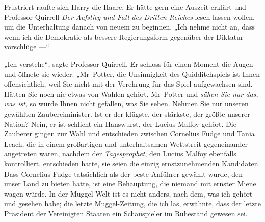 Frustriert raufte sich Harry die Haare. Er hätte gern eine Auszeit erklärt und Professor Quirrell \emph{Der Aufstieg und Fall des Dritten Reiches} lesen lassen wollen, um die Unterhaltung danach von neuem zu beginnen.
„Ich nehme nicht an, dass wenn ich die Demokratie als bessere Regierungsform gegenüber der Diktatur vorschlüge —“

„Ich verstehe“, sagte Professor Quirrell. Er schloss für einen Moment die Augen und öffnete sie wieder.
„Mr~Potter, die Unsinnigkeit des Quidditchspiels ist Ihnen offensichtlich, weil Sie nicht mit der Verehrung für das Spiel aufgewachsen sind. Hätten Sie noch nie etwas von Wahlen gehört, Mr~Potter und \emph{sähen Sie nur das, was ist}, so würde Ihnen nicht gefallen, was Sie sehen. Nehmen Sie nur unseren gewählten Zaubereiminister. Ist er der klügste, der stärkste, der größte unserer Nation? Nein, er ist schlicht ein Hanswurst, der Lucius Malfoy gehört. Die Zauberer gingen zur Wahl und entschieden zwischen Cornelius Fudge und Tania Leach, die in einem großartigen und unterhaltsamen Wettstreit gegeneinander angetreten waren, nachdem der \emph{Tagesprophet}, den Lucius Malfoy ebenfalls kontrolliert, entschieden hatte, sie seien die einzig ernstzunehmenden Kandidaten. Dass Cornelius Fudge tatsächlich als der beste Anführer gewählt wurde, den unser Land zu bieten hatte, ist eine Behauptung, die niemand mit ernster Miene wagen würde. In der Muggel-Welt ist es nicht anders, nach dem, was ich gehört und gesehen habe; die letzte Muggel-Zeitung, die ich las, erwähnte, dass der letzte Präsident der Vereinigten Staaten ein Schauspieler im Ruhestand gewesen sei.%
